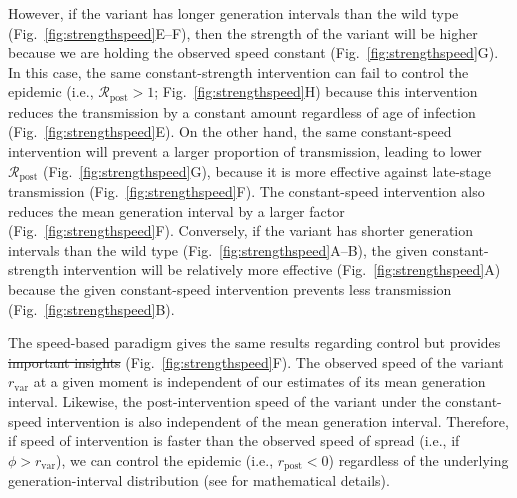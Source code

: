 \documentclass[12pt]{article}
\newcommand{\fref}[1]{Fig.~\ref{fig:#1}}
\newcommand{\vvvar}{\mathrm{var}}
\newcommand{\rx}[1]{\ensuremath{{r}_{#1}}\xspace}
\newcommand{\ry}[1]{\rx{\mathrm{#1}}}
\newcommand{\rv}{\rx{\vvvar}}
\newcommand{\Rx}[1]{\ensuremath{{\mathcal R}_{#1}}\xspace}
\newcommand{\Ry}[1]{\Rx{\mathrm{#1}}}
\providecommand{\DIFaddtex}[1]{{\protect\color{blue}\uwave{#1}}} %
\providecommand{\DIFdeltex}[1]{{\protect\color{red}\sout{#1}}}                      %
\providecommand{\DIFaddbegin}{} %
\providecommand{\DIFaddend}{} %
\providecommand{\DIFdelbegin}{} %
\providecommand{\DIFdelend}{} %
\providecommand{\DIFadd}[1]{\texorpdfstring{\DIFaddtex{#1}}{#1}} %
\providecommand{\DIFdel}[1]{\texorpdfstring{\DIFdeltex{#1}}{}} %
\newcommand{\DIFscaledelfig}{0.5}
\newlength{\DIFdelgraphicswidth} %
\newlength{\DIFdelgraphicsheight} %
\newcommand{\DIFaddincludegraphics}[2][]{{\color{blue}\fbox{\DIFOincludegraphics[#1]{#2}}}} %
\newcommand{\DIFdelincludegraphics}[2][]{%
\sbox{\DIFdelgraphicsbox}{\DIFOincludegraphics[#1]{#2}}%
\settoboxwidth{\DIFdelgraphicswidth}{\DIFdelgraphicsbox} %
\settoboxtotalheight{\DIFdelgraphicsheight}{\DIFdelgraphicsbox} %
\scalebox{\DIFscaledelfig}{%
\parbox[b]{\DIFdelgraphicswidth}{\usebox{\DIFdelgraphicsbox}\\[-\baselineskip] \rule{\DIFdelgraphicswidth}{0em}}\llap{\resizebox{\DIFdelgraphicswidth}{\DIFdelgraphicsheight}{%
\setlength{\unitlength}{\DIFdelgraphicswidth}%
\begin{picture}(1,1)%
\thicklines\linethickness{2pt} %
{\color[rgb]{1,0,0}\put(0,0){\framebox(1,1){}}}%
{\color[rgb]{1,0,0}\put(0,0){\line( 1,1){1}}}%
{\color[rgb]{1,0,0}\put(0,1){\line(1,-1){1}}}%
\end{picture}%
}\hspace*{3pt}}} %
} %
\DeclareRobustCommand{\DIFaddbegin}{\DIFOaddbegin \let\includegraphics\DIFaddincludegraphics} %
\DeclareRobustCommand{\DIFaddend}{\DIFOaddend \let\includegraphics\DIFOincludegraphics} %
\DeclareRobustCommand{\DIFdelbegin}{\DIFOdelbegin \let\includegraphics\DIFdelincludegraphics} %
\DeclareRobustCommand{\DIFdelend}{\DIFOaddend \let\includegraphics\DIFOincludegraphics} %
\begin{document}
However, if the variant has longer generation intervals than the wild type (\fref{strengthspeed}E--F), then the strength of the variant will be higher because we are holding the observed speed constant (\fref{strengthspeed}G).
In this case, the same constant-strength intervention can fail to control the epidemic (i.e., $\Ry{post} > 1$; \fref{strengthspeed}H) because this intervention reduces the transmission by a constant amount regardless of age of infection (\fref{strengthspeed}E).
On the other hand, the same constant-speed intervention will prevent a larger proportion of transmission, leading to lower $\Ry{post}$ (\fref{strengthspeed}G), because it is more effective against late-stage transmission (\fref{strengthspeed}F).
The constant-speed intervention also reduces the mean generation interval by a larger factor (\fref{strengthspeed}F).
Conversely, if the variant has shorter generation intervals than the wild type (\fref{strengthspeed}A--B), the given constant-strength intervention will be relatively more effective (\fref{strengthspeed}A) because the given constant-speed intervention prevents less transmission (\fref{strengthspeed}B).

The speed-based paradigm gives the same results regarding control but provides \DIFdelbegin \DIFdel{important insights }\DIFdelend \DIFaddbegin \DIFadd{additional insight }\DIFaddend (\fref{strengthspeed}F).
The observed speed of the variant $\rv$ at a given moment is independent of our estimates of its mean generation interval.
Likewise, the post-intervention speed of the variant under the constant-speed intervention is also independent of the mean generation interval.
Therefore, if speed of intervention is faster than the observed speed of spread (i.e., if $\phi > \rv$), we can control the epidemic (i.e., $\ry{post} < 0$) regardless of the underlying generation-interval distribution (see \cite{doi:10.1098/rspb.2020.1556} for mathematical details).
\end{document}
